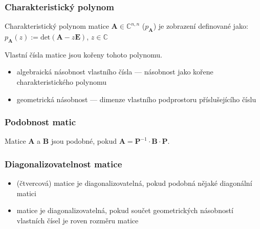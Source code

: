 \subsubsection*{Charakteristický polynom}
Charakteristický polynom matice $\textbf{A} \in \mathbb{C}^{n,n}$ ($p_{\textbf{A}}$) je zobrazení definované jako: $p_{\textbf{A}}(z):= \text{det}(\textbf{A} - z\textbf{E})$, $z \in \mathbb{C}$

Vlastní čísla matice jsou kořeny tohoto polynomu.

\begin{itemize}
	\item algebraická násobnost vlastního čísla --- násobnost jako kořene charakteristického polynomu
	\item geometrická násobnost --- dimenze vlastního podprostoru příslušejícího číslu 
\end{itemize}

\subsubsection*{Podobnost matic}
Matice \textbf{A} a \textbf{B} jsou podobné, pokud $\textbf{A} = \textbf{P}^{-1} \cdot \textbf{B} \cdot \textbf{P}$.

\subsubsection*{Diagonalizovatelnost matice}
\begin{itemize}
	\item (čtvercová) matice je diagonalizovatelná, pokud podobná nějaké diagonální matici
	\item matice je diagonalizovatelná, pokud součet geometrických násobností vlastních čísel je roven rozměru matice
\end{itemize} 
